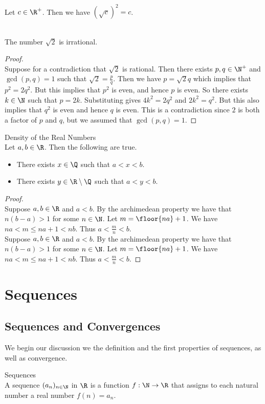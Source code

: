 \documentclass[a4paper]{article}
\begin{document}
\begin{lmm}{}{}\\
Let $c\in\R^+$. Then we have $(\sqrt{c})^2=c$. 
\end{lmm}

\begin{eg}{}{}\\
The number $\sqrt{2}$ is irrational. 
\begin{proof}\\
Suppose for a contradiction that $\sqrt{2}$ is rational. Then there exists $p,q\in\N^+$ and $\gcd(p,q)=1$ such that $\sqrt{2}=\frac{p}{q}$. Then we have $p=\sqrt{2}q$ which implies that $p^2=2q^2$. But this implies that $p^2$ is even, and hence $p$ is even. So there exists $k\in\N$ such that $p=2k$. Substituting gives $4k^2=2q^2$ and $2k^2=q^2$. But this also implies that $q^2$ is even and hence $q$ is even. This is a contradiction since $2$ is both a factor of $p$ and $q$, but we assumed that $\gcd(p,q)=1$. 
\end{proof}
\end{eg}

\begin{thm}{Density of the Real Numbers}{}\\
Let $a,b\in\R$. Then the following are true. 
\begin{itemize}
\item There exists $x\in\Q$ such that $a<x<b$. 
\item There exists $y\in\R\setminus\Q$ such that $a<y<b$. 
\end{itemize}
\begin{proof}\\
Suppose $a,b\in\R$ and $a<b$. By the archimedean property we have that $n(b-a)>1$ for some $n\in\N$. Let $m=\floor{na}+1$. We have $na<m\leq na+1<nb$. Thus $a<\frac{m}{n}<b$. \\

Suppose $a,b\in\R$ and $a<b$. By the archimedean property we have that $n(b-a)>1$ for some $n\in\N$. Let $m=\floor{na}+1$. We have $na<m\leq na+1<nb$. Thus $a<\frac{m}{n}<b$. 
\end{proof}
\end{thm}

\pagebreak
\section{Sequences}
\subsection{Sequences and Convergences}
We begin our discussion we the definition and the first properties of sequences, as well as convergence. 
\begin{defn}{Sequences}{}\\
A sequence $(a_n)_{n\in\N}$ in $\R$ is a function $f:\N\to\R$ that assigns to each natural number a real number $f(n)=a_n$. 
\end{defn}
\end{document}
